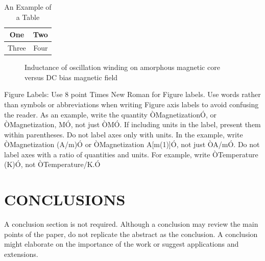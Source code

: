 \documentclass[letterpaper, 10 pt, conference]{ieeeconf}  %
\begin{document}
\begin{table}[h]
\caption{An Example of a Table}
\label{table_example}
\begin{center}
\begin{tabular}{|c||c|}
\hline
One & Two\\
\hline
Three & Four\\
\hline
\end{tabular}
\end{center}
\end{table}


   \begin{figure}[thpb]
      \centering
      \caption{Inductance of oscillation winding on amorphous
       magnetic core versus DC bias magnetic field}
      \label{figurelabel}
   \end{figure}
   

Figure Labels: Use 8 point Times New Roman for Figure labels. Use words rather than symbols or abbreviations when writing Figure axis labels to avoid confusing the reader. As an example, write the quantity ÒMagnetizationÓ, or ÒMagnetization, MÓ, not just ÒMÓ. If including units in the label, present them within parentheses. Do not label axes only with units. In the example, write ÒMagnetization (A/m)Ó or ÒMagnetization {A[m(1)]}Ó, not just ÒA/mÓ. Do not label axes with a ratio of quantities and units. For example, write ÒTemperature (K)Ó, not ÒTemperature/K.Ó

\section{CONCLUSIONS}

A conclusion section is not required. Although a conclusion may review the main points of the paper, do not replicate the abstract as the conclusion. A conclusion might elaborate on the importance of the work or suggest applications and extensions. 

\addtolength{\textheight}{-12cm}   %
\end{document}
